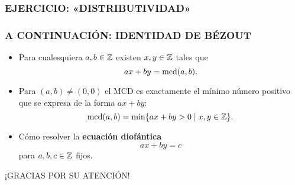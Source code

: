 \begin{frame}
  \frametitle{EJERCICIO: «DISTRIBUTIVIDAD»}



\end{frame}

\begin{frame}
  \frametitle{A CONTINUACIÓN: IDENTIDAD DE BÉZOUT}

  \begin{itemize}
  \item<2-> Para cualesquiera $a,b \in \mathbb{Z}$ existen $x,y \in \mathbb{Z}$ tales que
    $$ax + by = \operatorname{mcd} (a,b).$$

  \item<3-> Para $(a,b) \ne (0,0)$ el MCD es exactamente el mínimo número positivo
    que se expresa de la forma $ax + by$:
    $$\operatorname{mcd} (a,b) = \min \{ ax + by > 0 \mid x,y \in \mathbb{Z} \}.$$

  \item<4-> Cómo resolver la \textbf{ecuación diofántica}
    $$ax + by = c$$
    para $a,b,c \in \mathbb{Z}$ fijos.
  \end{itemize}
\end{frame}

\begin{frame}

  \vfill

  \begin{center}\huge\headingfont
    ¡GRACIAS POR SU ATENCIÓN!
  \end{center}

  \vfill
\end{frame}

